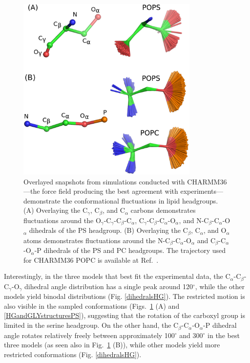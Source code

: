 \documentclass[journal=jpcbfk,manuscript=article]{achemso}
\begin{document}
\begin{figure}[]
  \centering
  \includegraphics[width=9.0cm]{../Figs/structures.eps}
  \caption{\label{HGstructuresPSandPC}
    Overlayed snapshots from simulations conducted with CHARMM36---the force field producing the best agreement with experiments---demonstrate the conformational fluctuations
    in lipid headgroups.
    (A) Overlaying the C$_\gamma$, C$_\beta$, and C$_\alpha$ carbons demonstrates fluctuations around the O$_\gamma$-C$_\gamma$-C$_\beta$-C$_\alpha$, C$_\gamma$-C$_\beta$-C$_\alpha$-O$_\alpha$,
    and N-C$_\beta$-C$_\alpha$-O$_\alpha$ dihedrals of the PS headgroup.
    (B) Overlaying the C$_\beta$, C$_\alpha$, and O$_\alpha$ atoms demonstrates fluctuations around the N-C$_\beta$-C$_\alpha$-O$_\alpha$ and C$_\beta$-C$_\alpha$-O$_\alpha$-P
    dihedrals of the PS and PC headgroups. The trajectory used for CHARMM36 POPC is available at Ref.~.}
\end{figure}

Interestingly, in the three models that best fit the experimental data,
the C$_\alpha$-C$_\beta$-C$_\gamma$-O$_\gamma$ dihedral angle distribution has a single peak around 120$^{\circ}$, while
the other models yield binodal distributions (Fig. \ref{dihedralsHG}).
The restricted motion is also visible in the sampled conformations (Figs.~\ref{HGstructuresPSandPC} (A) and \ref{HGandGLYstructuresPS}),
suggesting that the rotation of the carboxyl group is limited in the serine headgroup.
On the other hand, the C$_\beta$-C$_\alpha$-O$_\alpha$-P dihedral angle rotates relatively
freely between approximately 100$^{\circ}$ and 300$^{\circ}$ in the best three models (as seen also in Fig.~\ref{HGstructuresPSandPC} (B)),
while other models yield more restricted conformations (Fig. \ref{dihedralsHG}).
\end{document}
